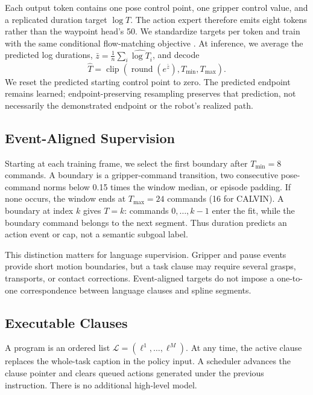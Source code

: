 Each output token contains one pose control point, one gripper control value, and a replicated duration target $\log T$. The action expert therefore emits eight tokens rather than the waypoint head's 50. We standardize targets per token and train with the same conditional flow-matching objective \cite{shukor2025smolvla,lipman2023flow}. At inference, we average the predicted log durations, $\bar z=\frac1n\sum_i\widehat{\log T}_i$, and decode
\begin{equation}
 \widehat T=\operatorname{clip}\!\left(
 \operatorname{round}(e^{\bar z}),T_{\min},T_{\max}\right).
 \label{eq:duration}
\end{equation}
We reset the predicted starting control point to zero. The predicted endpoint remains learned; endpoint-preserving resampling preserves that prediction, not necessarily the demonstrated endpoint or the robot's realized path.

\subsection{Event-Aligned Supervision}

Starting at each training frame, we select the first boundary after $T_{\min}=8$ commands. A boundary is a gripper-command transition, two consecutive pose-command norms below 0.15 times the window median, or episode padding. If none occurs, the window ends at $T_{\max}=24$ commands (16 for CALVIN). A boundary at index $k$ gives $T=k$: commands $0,\ldots,k-1$ enter the fit, while the boundary command belongs to the next segment. Thus duration predicts an action event or cap, not a semantic subgoal label.

This distinction matters for language supervision. Gripper and pause events provide short motion boundaries, but a task clause may require several grasps, transports, or contact corrections. Event-aligned targets do not impose a one-to-one correspondence between language clauses and spline segments.

\subsection{Executable Clauses}

A program is an ordered list $\mathcal L=(\ell^1,\ldots,\ell^M)$. At any time, the active clause replaces the whole-task caption in the policy input. A scheduler advances the clause pointer and clears queued actions generated under the previous instruction. There is no additional high-level model.

